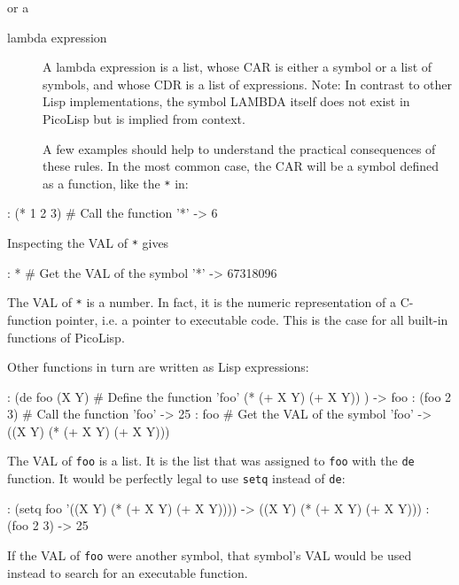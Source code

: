 or a 

\begin{description}
 \item[lambda expression] A lambda expression is a list, whose CAR is
either a symbol or a list of symbols, and whose CDR is a list of
expressions. Note: In contrast to other Lisp implementations, the symbol
LAMBDA itself does not exist in PicoLisp but is implied from context.

A few examples should help to understand the practical consequences of
these rules. In the most common case, the CAR will be a symbol defined
as a function, like the \texttt{*} in:
\end{description}

\begin{wideverbatim}
: (* 1 2 3)    # Call the function '*'
-> 6
\end{wideverbatim}

Inspecting the VAL of \texttt{*} gives


\begin{wideverbatim}
: *            # Get the VAL of the symbol '*'
-> 67318096
\end{wideverbatim}

The VAL of \texttt{*} is a number. In fact, it is the numeric representation of
a C-function pointer, i.e. a pointer to executable code. This is the
case for all built-in functions of PicoLisp.

Other functions in turn are written as Lisp expressions:


\begin{wideverbatim}
: (de foo (X Y)            # Define the function 'foo'
   (* (+ X Y) (+ X Y)) )
-> foo
: (foo 2 3)                # Call the function 'foo'
-> 25
: foo                      # Get the VAL of the symbol 'foo'
-> ((X Y) (* (+ X Y) (+ X Y)))
\end{wideverbatim}

The VAL of \texttt{foo} is a list. It is the list that was assigned to \texttt{foo}
with the \texttt{de} function. It would be perfectly legal to use \texttt{setq}
instead of \texttt{de}:


\begin{wideverbatim}
: (setq foo '((X Y) (* (+ X Y) (+ X Y))))
-> ((X Y) (* (+ X Y) (+ X Y)))
: (foo 2 3)
-> 25
\end{wideverbatim}

If the VAL of \texttt{foo} were another symbol, that symbol's VAL would be used
instead to search for an executable function.

